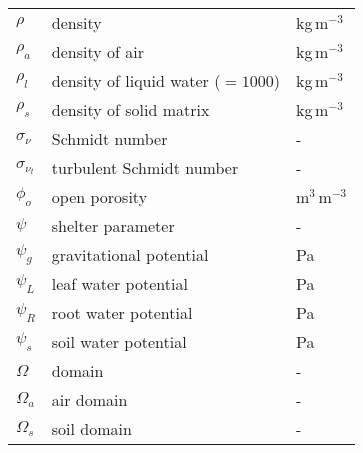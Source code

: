 \begin{longtable}{p{}p{}p{}}

	$\rho$ & density & kg\,m$^{-3}$ \\ 
	$\rho_a$ & density of air & kg\,m$^{-3}$ \\ 		
	$\rho_l$ & density of liquid water ($=\num{1000}$) & kg\,m$^{-3}$ \\ 	
	$\rho_s$ & density of solid matrix & kg\,m$^{-3}$ \\ 		

	$\sigma_{\nu}$ & Schmidt number & - \\ 	
	$\sigma_{\nu_t}$ & turbulent Schmidt number & - \\ 		
	$\phi_o$ & open porosity & m$^{3}$\,m$^{-3}$ \\
	$\psi$ & shelter parameter & - \\
	$\psi_g$ & gravitational potential & Pa \\	
	$\psi_L$ & leaf water potential & Pa \\
	$\psi_R$ & root water potential & Pa \\
	$\psi_s$ & soil water potential & Pa \\	

	$\Omega$ & domain & - \\
	$\Omega_a$ & air domain & - \\		
	$\Omega_s$ & soil domain & - \\	


\end{longtable}
%
